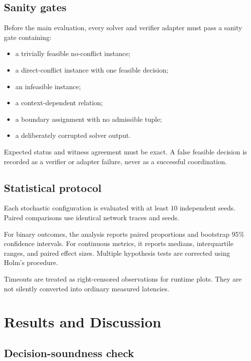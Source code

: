 \documentclass[pdflatex,sn-mathphys-num,iicol,oneside]{sn-jnl}
\begin{document}
\subsection{Sanity gates}

Before the main evaluation, every solver and verifier adapter must
pass a sanity gate containing:

\begin{itemize}
    \item a trivially feasible no-conflict instance;
    \item a direct-conflict instance with one feasible decision;
    \item an infeasible instance;
    \item a context-dependent relation;
    \item a boundary assignment with no admissible tuple;
    \item a deliberately corrupted solver output.
\end{itemize}

Expected status and witness agreement must be exact. A false feasible
decision is recorded as a verifier or adapter failure, never as a
successful coordination.

\subsection{Statistical protocol}

Each stochastic configuration is evaluated with at least
$10$ independent seeds. Paired comparisons
use identical network traces and seeds.

For binary outcomes, the analysis reports paired proportions and
bootstrap 95\% confidence intervals. For continuous metrics, it
reports medians, interquartile ranges, and paired effect sizes.
Multiple hypothesis tests are corrected using Holm's procedure.

Timeouts are treated as right-censored observations for runtime
plots. They are not silently converted into ordinary measured
latencies.

\section{Results and Discussion}
\label{sec:results}

\subsection{Decision-soundness check}
\end{document}
